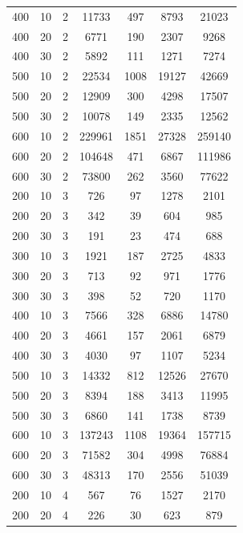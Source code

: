 \documentclass{article}
\begin{document}
\begin{table}[H]
\begin{center}
\begin{tabular}{| c | c | c | c | c | c | c |}
                    400 & 10 & 2 & 11733 & 497 & 8793 & 21023 \\
                    400 & 20 & 2 & 6771 & 190 & 2307 & 9268 \\
                    400 & 30 & 2 & 5892 & 111 & 1271 & 7274 \\
                    500 & 10 & 2 & 22534 & 1008 & 19127 & 42669 \\
                    500 & 20 & 2 & 12909 & 300 & 4298 & 17507 \\
                    500 & 30 & 2 & 10078 & 149 & 2335 & 12562 \\
                    600 & 10 & 2 & 229961 & 1851 & 27328 & 259140 \\
                    600 & 20 & 2 & 104648 & 471 & 6867 & 111986 \\
                    600 & 30 & 2 & 73800 & 262 & 3560 & 77622 \\
                    200 & 10 & 3 & 726 & 97 & 1278 & 2101 \\
                    200 & 20 & 3 & 342 & 39 & 604 & 985 \\
                    200 & 30 & 3 & 191 & 23 & 474 & 688 \\
                    300 & 10 & 3 & 1921 & 187 & 2725 & 4833 \\
                    300 & 20 & 3 & 713 & 92 & 971 & 1776 \\
                    300 & 30 & 3 & 398 & 52 & 720 & 1170 \\
                    400 & 10 & 3 & 7566 & 328 & 6886 & 14780 \\
                    400 & 20 & 3 & 4661 & 157 & 2061 & 6879 \\
                    400 & 30 & 3 & 4030 & 97 & 1107 & 5234 \\
                    500 & 10 & 3 & 14332 & 812 & 12526 & 27670 \\
                    500 & 20 & 3 & 8394 & 188 & 3413 & 11995 \\
                    500 & 30 & 3 & 6860 & 141 & 1738 & 8739 \\
                    600 & 10 & 3 & 137243 & 1108 & 19364 & 157715 \\
                    600 & 20 & 3 & 71582 & 304 & 4998 & 76884 \\
                    600 & 30 & 3 & 48313 & 170 & 2556 & 51039 \\
                    200 & 10 & 4 & 567 & 76 & 1527 & 2170 \\
                    200 & 20 & 4 & 226 & 30 & 623 & 879 \\

\end{tabular}
\end{center}
\end{table}
\end{document}
